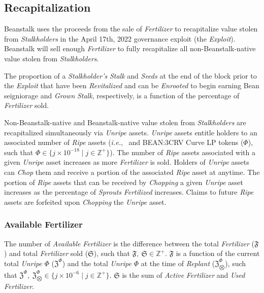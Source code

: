 \documentclass[tikz]{article}
\newcommand{\term}[1]{\textsl{#1}}
\newcommand{\Bean}{} %
\begin{document}
\subsection{Recapitalization}
Beanstalk uses the proceeds from the sale of \term{Fertilizer} to recapitalize value stolen from \term{Stalkholders} in the April 17th, 2022 governance exploit (the \term{Exploit}). Beanstalk will sell enough \term{Fertilizer} to fully recapitalize all non-Beanstalk-native value stolen from \term{Stalkholders}. 

The proportion of a \term{Stalkholder's} \term{Stalk} and \term{Seeds} at the end of the block prior to the \term{Exploit} that have been \term{Revitalized} and can be \term{Enrooted} to begin earning Bean seigniorage and \term{Grown} \term{Stalk}, respectively, is a function of the percentage of \term{Fertilizer} sold.

Non-Beanstalk-native and Beanstalk-native value stolen from \term{Stalkholders} are recapitalized simultaneously via \term{Unripe} assets. \term{Unripe} assets entitle holders to an associated number of \term{Ripe} assets (\term{i.e.}, \Bean\ and BEAN:3CRV Curve LP tokens ($\Phi$), such that $\Phi \in \{j \times 10^{-18} \mid j \in \mathbb{Z}^{+} \}$). The number of \term{Ripe} assets associated with a given \term{Unripe} asset increases as more \term{Fertilizer} is sold. Holders of \term{Unripe} assets can \term{Chop} them and receive a portion of the associated \term{Ripe} asset at anytime. The portion of \term{Ripe} assets that can be received by \term{Chopping} a given \term{Unripe} asset increases as the percentage of \term{Sprouts} \term{Fertilized} increases. Claims to future \term{Ripe} assets are forfeited upon \term{Chopping} the \term{Unripe} asset. 

\subsubsection{Available Fertilizer}
The number of \term{Available} \term{Fertilizer} is the difference between the total \term{Fertilizer} ($\mathfrak{F}$) and total \term{Fertilizer} sold ($\mathfrak{S}$), such that $\mathfrak{F},\ \mathfrak{S} \in \mathbb{Z}^{+}$. $\mathfrak{F}$ is a function of the current total \term{Unripe} $\Phi$ ($\mathfrak{Z}^{\Phi}$) and the total \term{Unripe} $\Phi$ at the time of \term{Replant} ($\mathfrak{Z}_{\bigotimes}^{\Phi}$), such that $\mathfrak{Z}^{\Phi},\ \mathfrak{Z}_{\bigotimes}^{\Phi} \in \{j \times 10^{-6} \mid j \in \mathbb{Z}^{+} \}$. $\mathfrak{S}$ is the sum of \term{Active} \term{Fertilizer} and \term{Used} \term{Fertilizer}.
\end{document}

